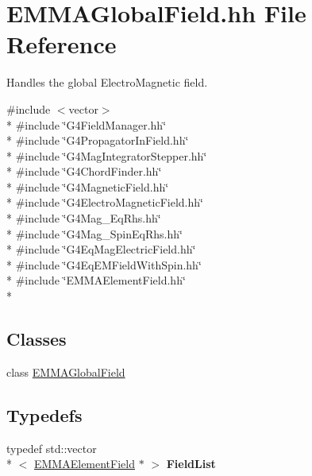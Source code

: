 \hypertarget{EMMAGlobalField_8hh}{\section{E\-M\-M\-A\-Global\-Field.\-hh File Reference}
\label{EMMAGlobalField_8hh}
}


Handles the global Electro\-Magnetic field.  


{\ttfamily \#include $<$vector$>$}\\*
{\ttfamily \#include \char`\"{}G4\-Field\-Manager.\-hh\char`\"{}}\\*
{\ttfamily \#include \char`\"{}G4\-Propagator\-In\-Field.\-hh\char`\"{}}\\*
{\ttfamily \#include \char`\"{}G4\-Mag\-Integrator\-Stepper.\-hh\char`\"{}}\\*
{\ttfamily \#include \char`\"{}G4\-Chord\-Finder.\-hh\char`\"{}}\\*
{\ttfamily \#include \char`\"{}G4\-Magnetic\-Field.\-hh\char`\"{}}\\*
{\ttfamily \#include \char`\"{}G4\-Electro\-Magnetic\-Field.\-hh\char`\"{}}\\*
{\ttfamily \#include \char`\"{}G4\-Mag\-\_\-\-Eq\-Rhs.\-hh\char`\"{}}\\*
{\ttfamily \#include \char`\"{}G4\-Mag\-\_\-\-Spin\-Eq\-Rhs.\-hh\char`\"{}}\\*
{\ttfamily \#include \char`\"{}G4\-Eq\-Mag\-Electric\-Field.\-hh\char`\"{}}\\*
{\ttfamily \#include \char`\"{}G4\-Eq\-E\-M\-Field\-With\-Spin.\-hh\char`\"{}}\\*
{\ttfamily \#include \char`\"{}E\-M\-M\-A\-Element\-Field.\-hh\char`\"{}}\\*
\subsection*{Classes}
\begin{DoxyCompactItemize}
\item 
class \hyperlink{classEMMAGlobalField}{E\-M\-M\-A\-Global\-Field}
\end{DoxyCompactItemize}
\subsection*{Typedefs}
\begin{DoxyCompactItemize}
\item 
\hypertarget{EMMAGlobalField_8hh_a40431785b28c5a3bdd4df87d5f637c5b}{typedef std\-::vector\\*
$<$ \hyperlink{classEMMAElementField}{E\-M\-M\-A\-Element\-Field} $\ast$ $>$ {\bfseries Field\-List}}\label{EMMAGlobalField_8hh_a40431785b28c5a3bdd4df87d5f637c5b}

\end{DoxyCompactItemize}


